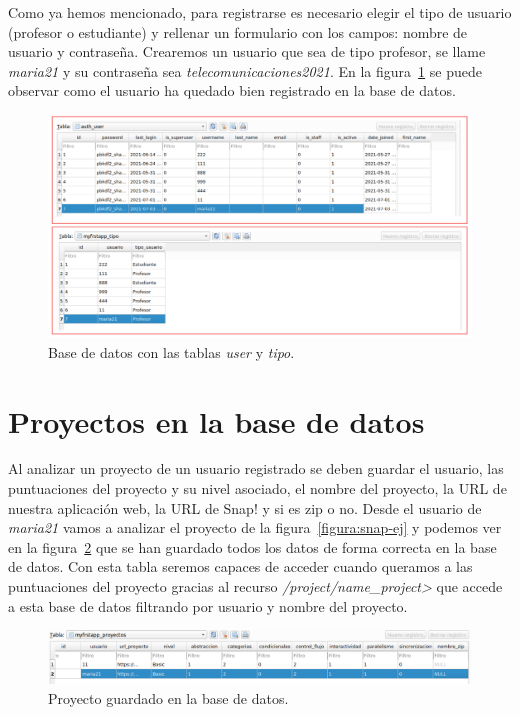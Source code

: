 \documentclass[a4paper, 12pt]{book}
\begin{document}
Como ya hemos mencionado, para registrarse es necesario elegir el tipo de usuario (profesor o estudiante) y rellenar un formulario con los campos: nombre de usuario y contraseña. Crearemos un usuario que sea de tipo profesor, se llame \textit{maria21} y su contraseña sea \textit{telecomunicaciones2021}. En la figura~\ref{figura:validacion-user} se puede observar como el usuario ha quedado bien registrado en la base de datos.
\begin{figure}[h]
            \centering
            \includegraphics[scale=0.37]{img/validacion-user.png}
            \caption{Base de datos con las tablas \textit{user} y \textit{tipo}.}
             \label{figura:validacion-user}
        \end{figure}

\section{Proyectos en la base de datos}

Al analizar un proyecto de un usuario registrado se deben guardar el usuario, las puntuaciones del proyecto y su nivel asociado, el nombre del proyecto, la URL de nuestra aplicación web, la URL de Snap! y si es zip o no. Desde el usuario de \textit{maria21} vamos a analizar el proyecto de la figura~\ref{figura:snap-ej} y podemos ver en la figura~\ref{figura:validacion-bbdd} que se han guardado todos los datos de forma correcta en la base de datos. Con esta tabla seremos capaces de acceder cuando queramos a las puntuaciones del proyecto gracias al recurso \textit{/project/\<name\_project>} que accede a esta base de datos filtrando por usuario y nombre del proyecto.
\begin{figure}[h]
            \centering
            \includegraphics[scale=0.37]{img/maria21.png}
            \caption{Proyecto guardado en la base de datos.}
             \label{figura:validacion-bbdd}
        \end{figure}
        
\end{document}
